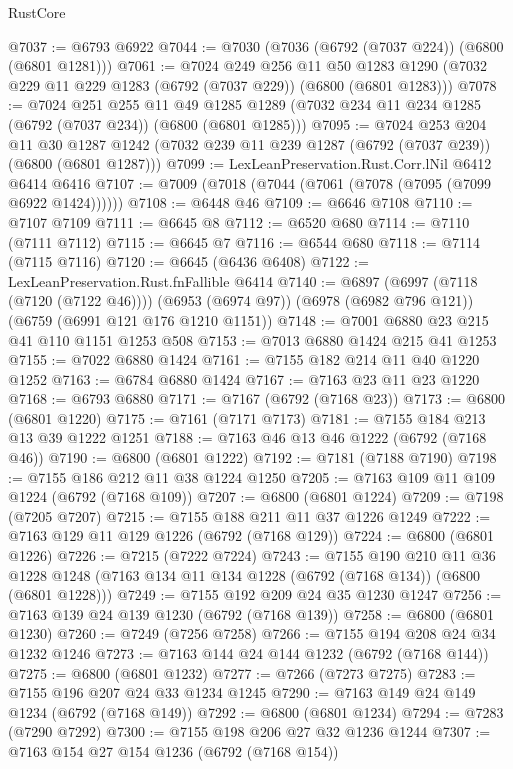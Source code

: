 \begin{lexlean}{RustCore}
\begin{coremodule}
@7037 := @6793 @6922
@7044 := @7030 (@7036 (@6792 (@7037 @224)) (@6800 (@6801 @1281)))
@7061 := @7024
    @249
    @256
    @11
    @50
    @1283
    @1290
    (@7032 @229 @11 @229 @1283 (@6792 (@7037 @229)) (@6800 (@6801 @1283)))
@7078 := @7024
    @251
    @255
    @11
    @49
    @1285
    @1289
    (@7032 @234 @11 @234 @1285 (@6792 (@7037 @234)) (@6800 (@6801 @1285)))
@7095 := @7024
    @253
    @204
    @11
    @30
    @1287
    @1242
    (@7032 @239 @11 @239 @1287 (@6792 (@7037 @239)) (@6800 (@6801 @1287)))
@7099 := LexLeanPreservation.Rust.Corr.lNil @6412 @6414 @6416
@7107 := @7009 (@7018 (@7044 (@7061 (@7078 (@7095 (@7099 @6922 @1424))))))
@7108 := @6448 @46
@7109 := @6646 @7108
@7110 := @7107 @7109
@7111 := @6645 @8
@7112 := @6520 @680
@7114 := @7110 (@7111 @7112)
@7115 := @6645 @7
@7116 := @6544 @680
@7118 := @7114 (@7115 @7116)
@7120 := @6645 (@6436 @6408)
@7122 := LexLeanPreservation.Rust.fnFallible @6414
@7140 := @6897
    (@6997 (@7118 (@7120 (@7122 @46))))
    (@6953 (@6974 @97))
    (@6978 (@6982 @796 @121))
    (@6759 (@6991 @121 @176 @1210 @1151))
@7148 := @7001 @6880 @23 @215 @41 @110 @1151 @1253 @508
@7153 := @7013 @6880 @1424 @215 @41 @1253
@7155 := @7022 @6880 @1424
@7161 := @7155 @182 @214 @11 @40 @1220 @1252
@7163 := @6784 @6880 @1424
@7167 := @7163 @23 @11 @23 @1220
@7168 := @6793 @6880
@7171 := @7167 (@6792 (@7168 @23))
@7173 := @6800 (@6801 @1220)
@7175 := @7161 (@7171 @7173)
@7181 := @7155 @184 @213 @13 @39 @1222 @1251
@7188 := @7163 @46 @13 @46 @1222 (@6792 (@7168 @46))
@7190 := @6800 (@6801 @1222)
@7192 := @7181 (@7188 @7190)
@7198 := @7155 @186 @212 @11 @38 @1224 @1250
@7205 := @7163 @109 @11 @109 @1224 (@6792 (@7168 @109))
@7207 := @6800 (@6801 @1224)
@7209 := @7198 (@7205 @7207)
@7215 := @7155 @188 @211 @11 @37 @1226 @1249
@7222 := @7163 @129 @11 @129 @1226 (@6792 (@7168 @129))
@7224 := @6800 (@6801 @1226)
@7226 := @7215 (@7222 @7224)
@7243 := @7155
    @190
    @210
    @11
    @36
    @1228
    @1248
    (@7163 @134 @11 @134 @1228 (@6792 (@7168 @134)) (@6800 (@6801 @1228)))
@7249 := @7155 @192 @209 @24 @35 @1230 @1247
@7256 := @7163 @139 @24 @139 @1230 (@6792 (@7168 @139))
@7258 := @6800 (@6801 @1230)
@7260 := @7249 (@7256 @7258)
@7266 := @7155 @194 @208 @24 @34 @1232 @1246
@7273 := @7163 @144 @24 @144 @1232 (@6792 (@7168 @144))
@7275 := @6800 (@6801 @1232)
@7277 := @7266 (@7273 @7275)
@7283 := @7155 @196 @207 @24 @33 @1234 @1245
@7290 := @7163 @149 @24 @149 @1234 (@6792 (@7168 @149))
@7292 := @6800 (@6801 @1234)
@7294 := @7283 (@7290 @7292)
@7300 := @7155 @198 @206 @27 @32 @1236 @1244
@7307 := @7163 @154 @27 @154 @1236 (@6792 (@7168 @154))

\end{coremodule}
\end{lexlean}
